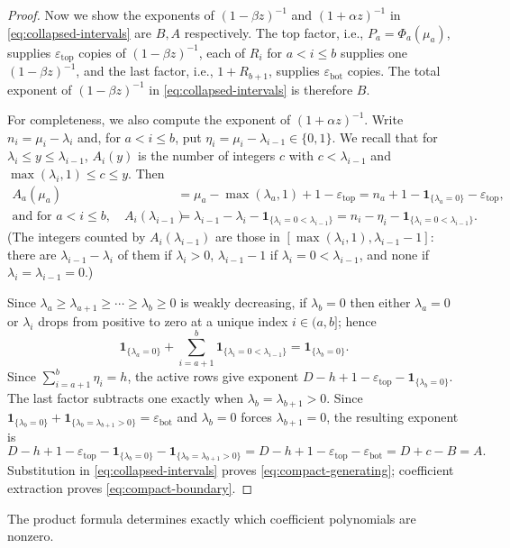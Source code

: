 \documentclass[11pt]{amsart}
\numberwithin{equation}{section}
\theoremstyle{definition}
\theoremstyle{remark}
\newcommand{\ind}{\mathbf 1}
\begin{document}
\begin{proof}
Now we show the exponents of $(1-\beta z)^{-1}$ and $ (1+ \alpha z)^{-1}$ in \eqref{eq:collapsed-intervals} are $B, A$ respectively. The top factor, i.e., $P_a=\Phi_a(\mu_a)$, supplies $\varepsilon_{\mathrm{top}}$ copies of
$(1-\beta z)^{-1}$, each of $R_i$ for $a<i\leq b$ supplies one $(1-\beta z)^{-1}$,
and the last factor, i.e., $ 1+R_{b+1}$, supplies $\varepsilon_{\mathrm{bot}}$ copies.
The total exponent of $(1-\beta z)^{-1}$ in \eqref{eq:collapsed-intervals} is therefore $B$.

For completeness, we also compute the exponent of $(1+\alpha z)^{-1}$.
Write $n_i=\mu_i-\lambda_i$ and, for $a<i\leq b$, put
$\eta_i=\mu_i-\lambda_{i-1}\in\{0,1\}$. We recall that for $\lambda_i \leq y \leq \lambda_{i-1}$, $A_{i}(y)$ is the number of integers $c$ with $c < \lambda_{i-1}$ and $\max(\lambda_i,1) \leq c \leq y$. Then
\begin{align*}
A_a(\mu_a)&=\mu_a-\max(\lambda_a,1)+1-\varepsilon_{\mathrm{top}}
  =n_a+1-\ind_{\{\lambda_a=0\}}-\varepsilon_{\mathrm{top}},\\
 \text{and for } a<i\leq b,\quad
 A_i(\lambda_{i-1})&=\lambda_{i-1}-\lambda_i-\ind_{\{\lambda_i=0<\lambda_{i-1}\}}
  =n_i-\eta_i-\ind_{\{\lambda_i=0<\lambda_{i-1}\}}.
  \end{align*} (The integers counted by $A_i(\lambda_{i-1})$ are those in $[\max(\lambda_i,1),\lambda_{i-1}-1]$: there are
$\lambda_{i-1}-\lambda_i$ of them if $\lambda_i>0$, $\lambda_{i-1}-1$ if $\lambda_i=0<\lambda_{i-1}$, and none if $\lambda_i=\lambda_{i-1}=0$.)

Since $\lambda_a\geq\lambda_{a+1}\geq\cdots\geq\lambda_b\geq0$ is weakly
decreasing, if $\lambda_b=0$ then either $\lambda_a=0$ or $\lambda_i$ drops
from positive to zero at a unique index $i\in(a,b]$; hence
\[
 \ind_{\{\lambda_a=0\}}+
 \sum_{i=a+1}^b\ind_{\{\lambda_i=0<\lambda_{i-1}\}}
 =\ind_{\{\lambda_b=0\}}.
\]
Since $\sum_{i=a+1}^b\eta_i=h$, the active rows give exponent
$D-h+1-\varepsilon_{\mathrm{top}}-\ind_{\{\lambda_b=0\}}$.
The last factor subtracts one exactly when
$\lambda_b=\lambda_{b+1}>0$. Since $\ind_{\{\lambda_b=0\}}+\ind_{\{\lambda_b=\lambda_{b+1}>0\}} =\varepsilon_{\mathrm{bot}}$ and $\lambda_b=0$ forces $\lambda_{b+1}=0$, the resulting exponent is
\[
 D-h+1-\varepsilon_{\mathrm{top}} 
 - \ind_{\{\lambda_b=0\}}-\ind_{\{\lambda_b=\lambda_{b+1}>0\}}
=D-h+1-\varepsilon_{\mathrm{top}} 
 -\varepsilon_{\mathrm{bot}}
 =D+c-B=A.
\]
Substitution in \eqref{eq:collapsed-intervals} proves
\eqref{eq:compact-generating}; coefficient extraction proves
\eqref{eq:compact-boundary}.
\end{proof}
The product formula determines exactly which coefficient
polynomials are nonzero.
\end{document}
